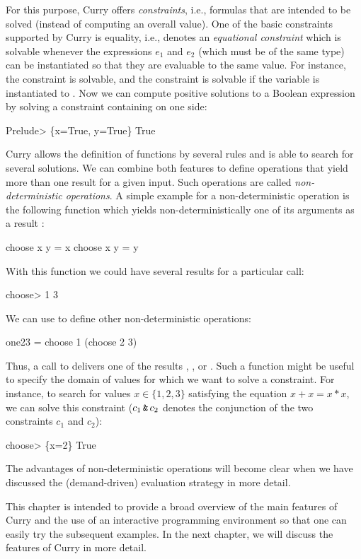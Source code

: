 For this purpose, Curry offers \emph{constraints},
i.e., formulas that are intended to be solved (instead of computing
an overall value). One of the basic constraints supported by Curry
is equality, i.e.,  denotes an
\emph{equational constraint}%
which is solvable whenever the expressions $e_1$ and $e_2$
(which must be of the same type) can be instantiated so that
they are evaluable to the same value. For instance,
the constraint  is solvable, and
the constraint  is solvable if the variable 
is instantiated to . Now we can compute positive solutions
to a Boolean expression by solving a constraint containing 
on one side:
\begin{prog}
Prelude> 
\{x=True, y=True\} True
\end{prog}
%
Curry allows the definition of functions by several rules
and is able to search for several solutions. We can combine
both features to define operations that yield more than one
result for a given input. Such operations are called
\emph{non-deterministic operations}.%
A simple example for a non-deterministic operation
is the following function  which yields
non-deterministically one of its arguments as a result
:
\begin{prog}
choose x y = x
choose x y = y
\end{prog}
With this function we could have several results for a particular call:
\begin{prog}
choose> 
1
3
\end{prog}
We can use  to define other non-deterministic operations:
\begin{prog}
one23 = choose 1 (choose 2 3)
\end{prog}
Thus, a call to  delivers one of the results ,
, or . Such a function might be useful
to specify the domain of values for which we want to solve a
constraint. For instance, to search for values $x \in \{1,2,3\}$
satisfying the equation $x+x = x*x$, we can solve
this constraint ($c_1\,\code{\&}\,c_2$ denotes the conjunction
of the two constraints $c_1$ and $c_2$):
\begin{prog}
choose> 
\{x=2\} True
\end{prog}
The advantages of non-deterministic operations will become clear
when we have discussed the (demand-driven) evaluation strategy
in more detail.

This chapter is intended to provide a broad overview
of the main features of Curry and the use of an interactive
programming environment so that one can easily try the subsequent
examples. In the next chapter, we will discuss the features
of Curry in more detail.


